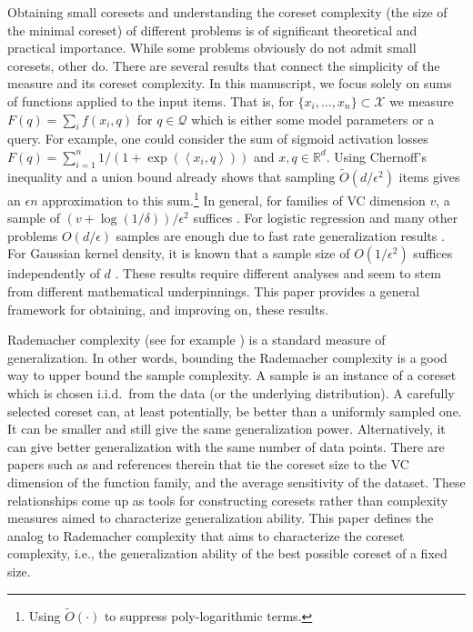 \documentclass[anon,12pt]{colt2019} %
\newcommand{\ip}[1]{\left \langle #1 \right \rangle}
\newcommand{\R}{\mathbb{R}}
\newcommand{\eps}{\epsilon}
\newcommand{\X}{\mathcal{X}}
\newcommand{\Q}{\mathcal{Q}}
\begin{document}
Obtaining small coresets and understanding the coreset complexity (the size of the minimal coreset) of different problems is of significant theoretical and practical importance.
While some problems obviously do not admit small coresets, other do. 
There are several results that connect the simplicity of the measure and its coreset complexity.
In this manuscript, we focus solely on sums of functions applied to the input items.
That is, for $\{x_i,\ldots,x_n\} \subset \X$ we measure $F(q) = \sum_i f(x_i,q)$ for $q \in \Q$ which is either some model parameters or a query.
For example, one could consider the sum of sigmoid activation losses $F(q) = \sum_{i=1}^{n} 1/(1+ \exp(\ip{x_i,q}))$ and $x,q\in \R^d$.
Using Chernoff's inequality and a union bound already shows that sampling $\tilde O(d/\eps^2)$ items gives an $\eps n$ approximation to this sum.\footnote{Using $\tilde O(\cdot)$ to suppress poly-logarithmic terms.} 
In general, for families of VC dimension $v$, a sample of $(v+\log(1/\delta))/\eps^2$ suffices \cite{talagrand1994sharper}.
For logistic regression and many other problems $O(d/\eps)$ samples are enough due to fast rate generalization results \cite{van2015fast}.
For Gaussian kernel density, it is known that a sample size of $O(1/\eps^2)$ suffices independently of $d$  \cite{lopez2015towards}.
These results require different analyses and seem to stem from different mathematical underpinnings. 
This paper provides a general framework for obtaining, and improving on, these results. 

Rademacher complexity (see for example \cite{Bartlett:2003:RGC:944919.944944}) is a standard measure of generalization.
In other words, bounding the Rademacher complexity is a good way to upper bound the sample complexity. 
A sample is an instance of a coreset which is chosen i.i.d.\ from the data (or the underlying distribution).
A carefully selected coreset can, at least potentially, be better than a uniformly sampled one. 
It can be smaller and still give the same generalization power. 
Alternatively, it can give better generalization with the same number of data points. 
There are papers such as \cite{langberg2010universal, tolochinsky2018coresets} and references therein that tie the coreset size to the VC dimension of the  function family, and the average sensitivity of the dataset. 
These relationships come up as tools for constructing coresets rather than complexity measures aimed to characterize generalization ability. 
This paper defines the analog to Rademacher complexity that aims to characterize the coreset complexity, i.e., the generalization ability of the best possible coreset of a fixed size.
 
\end{document}
